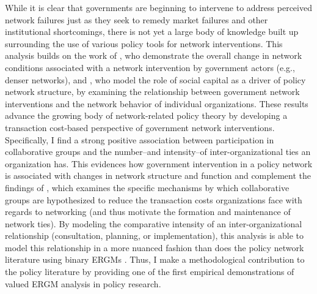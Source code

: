 \documentclass[12pt,a4paper,titlepage]{article}
\begin{document}
While it is clear that governments are beginning to intervene to address perceived network failures just as they seek to remedy market failures and other institutional shortcomings, there is not yet a large body of knowledge built up surrounding the use of various policy tools for network interventions. This analysis builds on the work of \textcite{schneider2003}, who demonstrate the overall change in network conditions associated with a network intervention by government actors (e.g., denser networks), and \textcite{henry2011}, who model the role of social capital as a driver of policy network structure, by examining the relationship between government network interventions and the network behavior of individual organizations.  These results advance the growing body of network-related policy theory by developing a transaction cost-based perspective of government network interventions. Specifically, I find a strong positive association between participation in collaborative groups and the number--and intensity--of inter-organizational ties an organization has. This evidences how government intervention in a policy network is associated with changes in network structure and function and complement the findings of \textcite{scott2015-a}, which examines the specific mechanisms by which collaborative groups are hypothesized to reduce the transaction costs organizations face with regards to networking (and thus motivate the formation and maintenance of network ties). By modeling the comparative intensity of an inter-organizational relationship (consultation, planning, or implementation), this analysis is able to model this relationship in a more nuanced fashion than does the policy network literature using binary ERGMs \parencite[e.g.,][]{lubell2012, gerber2013, schneider2003}. Thus, I make a methodological contribution to the policy literature by providing one of the first empirical demonstrations of valued ERGM analysis in policy research.
\end{document}
